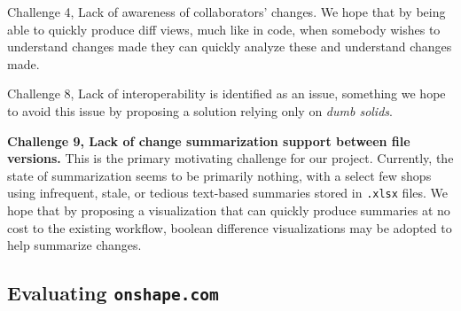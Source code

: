 \documentclass[sigconf,authorversion,nonacm]{acmart}
\begin{document}
Challenge 4, Lack of awareness of collaborators' changes.
We hope that by being able to quickly produce diff views, much like in code, when somebody wishes to understand changes made they can quickly analyze these and understand changes made.

Challenge 8, Lack of interoperability is identified as an issue, something we hope to avoid this issue by proposing a solution relying only on \emph{dumb solids}.

\textbf{Challenge 9, Lack of change summarization support between file versions.}
This is the primary motivating challenge for our project.
Currently, the state of summarization seems to be primarily nothing, with a select few shops using infrequent, stale, or tedious text-based summaries stored in \texttt{.xlsx} files.
We hope that by proposing a visualization that can quickly produce summaries at no cost to the existing workflow, boolean difference visualizations may be adopted to help summarize changes.

\subsection{Evaluating \texttt{onshape.com}}
\end{document}
